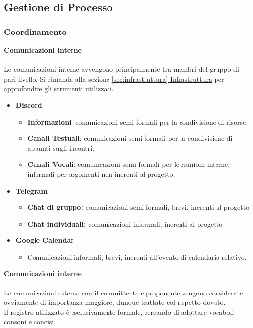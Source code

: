 \subsection{Gestione di Processo}
\subsubsection{Coordinamento}
\textbf{Comunicazioni interne}\\\\
Le comunicazioni interne avvengono principalmente tra membri del gruppo di pari livello. Si rimanda alla sezione \hyperref[sec:infrastruttura]{\ref{sec:infrastruttura} Infrastruttura} per approfondire gli strumenti utilizzati.
\begin{itemize}
  \item{\textbf{Discord}}
  \begin{itemize}
    \item \textbf{Informazioni}: comunicazioni semi-formali per la condivisione di risorse.
    \item \textbf{Canali Testuali}: comunicazioni semi-formali per la condivisione di appunti sugli incontri.
    \item \textbf{Canali Vocali}: comunicazioni semi-formali per le riunioni interne; informali per argomenti non inerenti al progetto.
  \end{itemize}
  \item{\textbf{Telegram}}
  \begin{itemize}
    \item{\textbf{Chat di gruppo:} comunicazioni semi-formali, brevi, inerenti al progetto}
    \item{\textbf{Chat individuali:} comunicazioni informali, inerenti al progetto}
  \end{itemize}
  \item{\textbf{Google Calendar}}
  \begin{itemize}
    \item{Comunicazioni informali, brevi, inerenti all'evento di calendario relativo.}
  \end{itemize}
\end{itemize}
\textbf{Comunicazioni interne}
\\\\
Le comunicazioni esterne con il committente e proponente vengono considerate ovviamente di importanza maggiore, dunque trattate col rispetto dovuto.\\
Il registro utilizzato è esclusivamente formale, cercando di adottare vocaboli consoni e concisi.
